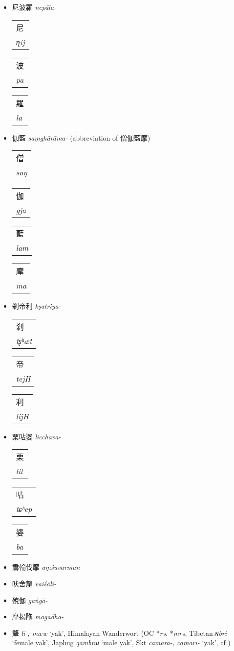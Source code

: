\documentclass[oneside,a4paper,11pt]{article}
\newcommand{\ipa}[1]{{\phon\textit{#1}}}
\newcommand{\zh}[1]{{\cn #1}}
\newcommand{\zhc}[2]{\zh{#1} \ipa{#2}}
\newcommand{\zhd}[2]{\begin{tabular}{l}
\zh{#1}\\
\ipa{#2}\\
\end{tabular}}
\begin{document}
\begin{itemize}
\item \zhc{尼波羅}{nepāla-}

\zhd{尼}{ɳij}\zhd{波}{pa}\zhd{羅}{la}
\item \zhc{伽藍}{saṃghārāma-} (abbreviation of \zh{僧伽藍摩})

\zhd{僧}{soŋ}\zhd{伽}{gja}\zhd{藍}{lam}\zhd{摩}{ma}
\item \zhc{剎帝利}{kṣatriya-}

\zhd{剎}{tʂʰæt}\zhd{帝}{tejH}\zhd{利}{lijH}
\item \zhc{栗呫婆}{licchava-}

\zhd{栗}{lit}\zhd{呫}{tɕʰep}\zhd{婆}{ba}
\item \zhc{鴦輸伐摩}{aṃśuvarman-}
\item \zhc{吠舍釐}{vaiśālī-}
\item \zhc{殑伽}{gaṅgā-}
\item \zhc{摩揭陁}{māgadha-}

\item \zhc{犛}{li ; mæw} `yak', Himalayan Wanderwort (OC *\ipa{rə}, *\ipa{mrə}, Tibetan \ipa{ɴbri} `female yak', Japhug \ipa{qambrɯ} `male yak', Skt \ipa{camara-, camarī-} `yak', cf \citealt{jacques16camara})
\end{itemize}
\end{document}
